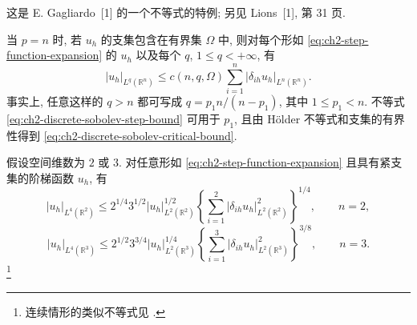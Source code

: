 这是 E. Gagliardo~[1] 的一个不等式的特例; 另见 Lions~[1], 第 31 页.

\begin{Remark}
\label{rem:ch2-discrete-sobolev-critical-case}
当 $p=n$ 时, 若 $u_h$ 的支集包含在有界集 $\Omega$ 中, 则对每个形如 \eqref{eq:ch2-step-function-expansion} 的 $u_h$ 以及每个 $q$, $1\leq q<+\infty$, 有
\begin{equation}
|u_h|_{L^q(\mathbb R^n)}
\leq c(n,q,\Omega)\sum_{i=1}^{n}|\delta_{ih}u_h|_{L^n(\mathbb R^n)}.
\label{eq:ch2-discrete-sobolev-critical-bound}
\end{equation}
事实上, 任意这样的 $q>n$ 都可写成 $q=p_1n/(n-p_1)$, 其中 $1\leq p_1<n$. 不等式 \eqref{eq:ch2-discrete-sobolev-step-bound} 可用于 $p_1$, 且由 Hölder 不等式和支集的有界性得到 \eqref{eq:ch2-discrete-sobolev-critical-bound}.
\end{Remark}

\begin{Proposition}
\label{prop:ch2-discrete-ladyzhenskaya-step}
假设空间维数为 $2$ 或 $3$. 对任意形如 \eqref{eq:ch2-step-function-expansion} 且具有紧支集的阶梯函数 $u_h$, 有
\begin{equation}
|u_h|_{L^4(\mathbb R^2)}
\leq2^{1/4}3^{1/2}|u_h|_{L^2(\mathbb R^2)}^{1/2}
\left\{\sum_{i=1}^{2}|\delta_{ih}u_h|_{L^2(\mathbb R^2)}^2\right\}^{1/4},
\qquad n=2,
\label{eq:ch2-discrete-ladyzhenskaya-two-dimensional}
\end{equation}
\begin{equation}
|u_h|_{L^4(\mathbb R^3)}
\leq2^{1/2}3^{3/4}|u_h|_{L^2(\mathbb R^3)}^{1/4}
\left\{\sum_{i=1}^{3}|\delta_{ih}u_h|_{L^2(\mathbb R^3)}^2\right\}^{3/8},
\qquad n=3.
\label{eq:ch2-discrete-ladyzhenskaya-three-dimensional}
\end{equation}
\footnote{连续情形的类似不等式见 .}
\end{Proposition}

